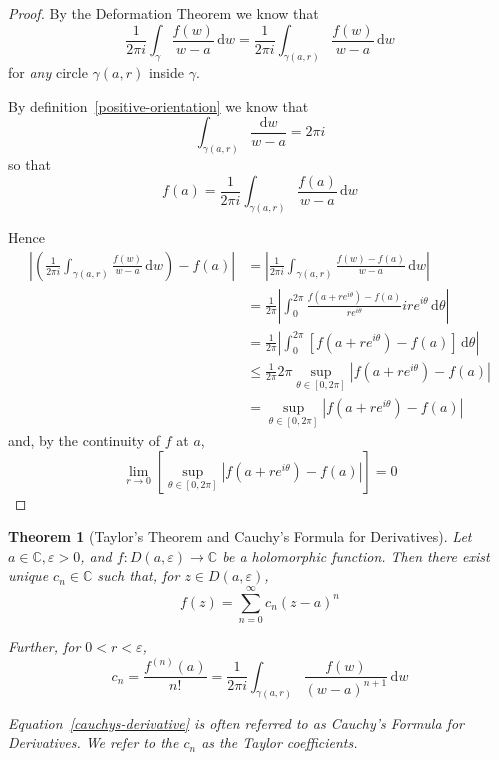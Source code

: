 \documentclass[10pt,fleqn]{article}
\newcommand{\diff}{\,\mathrm{d}}
\newcommand{\comps}{\mathbb{C}}
\newcommand{\eps}{\varepsilon}
\theoremstyle{definition} \newtheorem{defn}{Definition}[section]
\theoremstyle{plain}      \newtheorem{thm}[defn]{Theorem}
\theoremstyle{definition} \newtheorem{prop}[defn]{Proposition}
\theoremstyle{plain}      \newtheorem{lem}[defn]{Lemma}
\theoremstyle{definition} \newtheorem{cor}[defn]{Corollary}
\theoremstyle{definition} \newtheorem{ex}[defn]{Example}
\theoremstyle{definition} \newtheorem{rem}[defn]{Remark}
\begin{document}
\begin{proof}
    By the Deformation Theorem we know that
    \[
        \frac{1}{2\pi i}\int_{\gamma}\frac{f(w)}{w-a}\diff w=
        \frac{1}{2\pi i}\int_{\gamma(a,r)}\frac{f(w)}{w-a}\diff w
    \]
    for \emph{any} circle $\gamma(a,r)$ inside $\gamma$.

    By definition~\ref{positive-orientation} we know that
    \[
        \int_{\gamma(a,r)}\frac{\mathrm{d}w}{w-a}=
        2\pi i
    \]
    so that
    \[
        f(a)=
        \frac{1}{2\pi i}\int_{\gamma(a,r)}\frac{f(a)}{w-a}\diff w
    \]

    Hence
    \begin{align*}
        \left|\left(\frac{1}{2\pi i}\int_{\gamma(a,r)}\frac{f(w)}{w-a}\diff w\right)-f(a)\right|
        &=
        \left|\frac{1}{2\pi i}\int_{\gamma(a,r)}\frac{f(w)-f(a)}{w-a}\diff w\right|\\
        &=
        \frac{1}{2\pi}\left|\int_0^{2\pi}\frac{f(a+re^{i\theta})-f(a)}{re^{i\theta}}ire^{i\theta}\diff\theta\right|\\
        &=
        \frac{1}{2\pi}\left|\int_0^{2\pi}[f(a+re^{i\theta})-f(a)]\diff\theta\right|\\
        &\leq
        \frac{1}{2\pi}2\pi\sup_{\theta\in[0,2\pi]}|f(a+re^{i\theta})-f(a)|\\
        &=
        \sup_{\theta\in[0,2\pi]}|f(a+re^{i\theta})-f(a)|
    \end{align*}
    and, by the continuity of $f$ at $a$,
    \[
        \lim_{r\to0}\left[\sup_{\theta\in[0,2\pi]}|f(a+re^{i\theta})-f(a)|\right]
        =0
    \]
\end{proof}

\begin{thm}[Taylor's Theorem and Cauchy's Formula for Derivatives]
    Let $a\in\comps,\eps>0$, and $f:D(a,\eps)\to\comps$ be a holomorphic function.
    Then there exist unique $c_n\in\comps$ such that, for $z\in D(a,\eps)$,
    \begin{equation}
        f(z)=
        \sum_{n=0}^{\infty} c_n(z-a)^n
    \end{equation}

    Further, for $0<r<\eps$,
    \begin{equation}\label{cauchys-derivative}
        c_n=
        \frac{f^{(n)}(a)}{n!}=
        \frac{1}{2\pi i}\int_{\gamma(a,r)}\frac{f(w)}{(w-a)^{n+1}}\diff w
    \end{equation}

    Equation~\ref{cauchys-derivative} is often referred to as \emph{Cauchy's Formula for Derivatives}.
    We refer to the $c_n$ as the \emph{Taylor coefficients}.
\end{thm}
\end{document}
